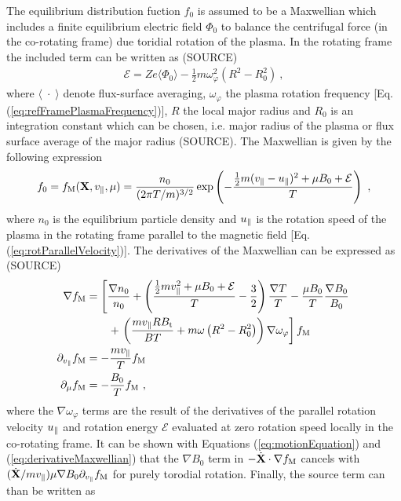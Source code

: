 The equilibrium distribution fuction $f_0$ is assumed to be a Maxwellian which includes a finite equilibrium electric field $\Phi_0$ to balance the centrifugal force (in the co-rotating frame) due toridial rotation of the plasma. In the rotating frame the included term can be written as (SOURCE)
\begin{gather}
	\mathcal{E} = Z e \langle \Phi_0 \rangle - \frac{1}{2} m \omega_\varphi^2 \left(R^2 - R_0^2\right)~,
	\label{eq:rotEnergy}
\end{gather}
where $\langle\;\cdot\;\rangle$ denote flux-surface averaging, $\omega_\varphi$ the plasma rotation frequency [Eq. (\ref{eq:refFramePlasmaFrequency})], $R$ the local major radius and $R_0$ is an integration constant which can be chosen, i.e. major radius of the plasma or flux surface average of the major radius (SOURCE). The Maxwellian is given by the following expression
\begin{gather}
	f_0 = f_\mathrm{M}(\boldsymbol{\mathbf{X}}, v_\parallel, \mu) = \frac{n_0}{(2\pi T/m)^{3/2}}\exp\left(-\frac{\frac{1}{2} m (v_\parallel - u_\parallel)^2 + \mu B_0 + \mathcal{E}}{T}\right)~,
	\label{eq:maxwellian}
\end{gather}   
where $n_0$ is the equilibrium particle density and $u_\parallel$ is the rotation speed of the plasma in the rotating frame parallel to the magnetic field [Eq. (\ref{eq:rotParallelVelocity})]. The derivatives of the Maxwellian can be expressed as (SOURCE) 
\begin{gather}
	\begin{aligned}
		\nabla f_\mathrm{M}           &= \left[\frac{\nabla n_0}{n_0} + \left(\frac{\frac{1}{2} m v_\parallel^2 + \mu B_0 + \mathcal{E}}{T} - \frac{3}{2}\right)\frac{\nabla T}{T} - \frac{\mu B_0}{T} \frac{\nabla B_0}{B_0} \right. \\ 
		&\qquad + \left. \left(\frac{m v_\parallel R B_\mathrm{t}}{BT} + m\omega \left(R^2 - R_0^2\right)\right) \nabla \omega_\varphi\right] f_\mathrm{M} \\
		\partial_{v_\parallel} f_\mathrm{M} &= - \frac{m v_\parallel}{T} f_\mathrm{M} \\
		\partial_\mu f_\mathrm{M}     &= - \frac{B_0}{T} f_\mathrm{M} ~,  
	\end{aligned}
	\label{eq:derivativeMaxwellian}
\end{gather} 
where the $\nabla \omega_\varphi$ terms are the result of the derivatives of the parallel rotation velocity $u_\parallel$ and rotation energy $\mathcal{E}$ evaluated at zero rotation speed locally in the co-rotating frame. It can be shown with Equations (\ref{eq:motionEquation}) and (\ref{eq:derivativeMaxwellian}) that the $\nabla B_0$ term in $-\dot{\boldsymbol{\mathbf{X}}}\cdot \nabla f_\mathrm{M}$ cancels with $(\dot{\boldsymbol{\mathbf{X}}}/m v_\parallel) \mu \nabla B_0 \partial_{v_\parallel} f_\mathrm{M}$ for purely torodial rotation. Finally, the source term can than be written as 

